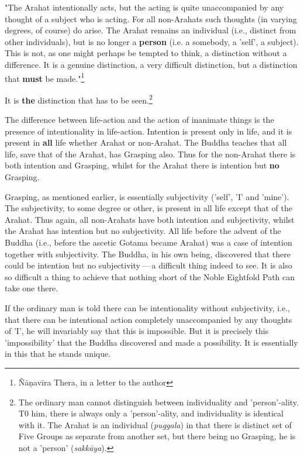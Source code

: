 "The Arahat intentionally acts, but the
acting is quite unaccompanied by any thought of a subject who is acting.
For all non-Arahats such thoughts (in varying degrees, of course) do
arise. The Arahat remains an individual (i.e., distinct from other
individuals), but is no longer a \textbf{person} (i.e. a somebody, a 'self', a
subject). This is not, as one might perhaps be tempted to think, a
distinction without a difference. It is a genuine distinction, a very
difficult distinction, but a distinction that \textbf{must} be made."\footnote{Ñāṇavīra Thera, in a letter to the author}


It is \textbf{the} distinction that has to be seen.\footnote{The ordinary man cannot distinguish between individuality and 'person'-ality. T0 him, there is always only a 'person'-ality, and individuality is identical with it. The Arahat is an individual (\emph{puggala}) in that there is distinct set of Five Groups as separate from another set, but there being no Grasping, he is not a 'person' (\emph{sakkāya}).}


The difference between life-action and the action of inanimate things is
the presence of intentionality in life-action. Intention is present only
in life, and it is present in \textbf{all} life whether Arahat or non-Arahat.
The Buddha teaches that all life, save that of the Arahat, has Grasping
also. Thus for the non-Arahat there is both intention and Grasping,
whilst for the Arahat there is intention but \textbf{no} Grasping.


Grasping, as mentioned earlier, is essentially subjectivity ('self', 'I' and 'mine').
The subjectivity, to some degree or other, is present in all life except
that of the Arahat. Thus again, all non-Arahats have both intention and
subjectivity, whilst the Arahat has intention but no subjectivity. All
life before the advent of the Buddha (i.e., before the ascetic Gotama
became Arahat) was a case of intention together with subjectivity. The
Buddha, in his own being, discovered that there could be intention but
no subjectivity — a difficult thing indeed to see. It is also so
difficult a thing to achieve that nothing short of the Noble Eightfold
Path can take one there.


If the ordinary man is told there can be intentionality without
subjectivity, i.e., that there can be intentional action completely
unaccompanied by any thoughts of 'I', he will invariably say that this
is impossible. But it is precisely this 'impossibility' that the Buddha
discovered and made a possibility. It is essentially in this that he
stands unique.


